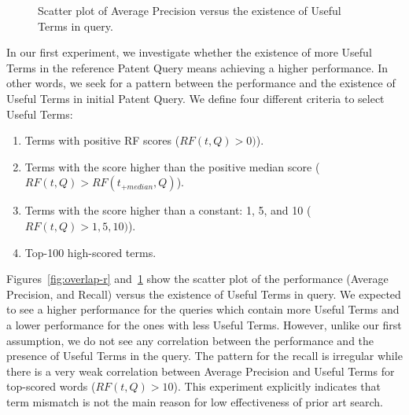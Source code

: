 \begin{figure}[t!]
\begin{centering}
 \hspace*{1.5cm} 
\par\end{centering}

\protect\caption{Scatter plot of Average Precision versus the existence of Useful Terms in query.}
\label{fig:overlap-p}
\end{figure}
In our first experiment, we investigate whether the existence of more Useful Terms in the reference Patent Query means achieving a higher performance. In other words, we seek for a pattern between the performance and the existence of Useful Terms in initial Patent Query. We define four different criteria to select Useful Terms:
\begin{enumerate}
\item Terms with positive RF scores ($ RF(t, Q)>0) $).
\item Terms with the score higher than the positive median score ($ RF(t, Q)>RF(t_{+median}, Q) $).
\item Terms with the score higher than a constant: 1, 5, and 10 ($ RF(t, Q)>1, 5, 10) $).
\item Top-100 high-scored terms.
\end{enumerate}

Figures~\ref{fig:overlap-r} and~\ref{fig:overlap-p} show the scatter plot of the performance (Average Precision, and Recall) versus the existence of Useful Terms in query. 
We expected to see a higher performance for the queries which contain more Useful Terms and a lower performance for the ones with less Useful Terms. However, unlike our first assumption, we do not see any correlation between the performance and the presence of Useful Terms in the query. The pattern for the recall is irregular while there is a very weak correlation between Average Precision and Useful Terms for top-scored words ($RF(t, Q)>10$). This experiment explicitly indicates that term mismatch is not the main reason for low effectiveness of prior art search. 
